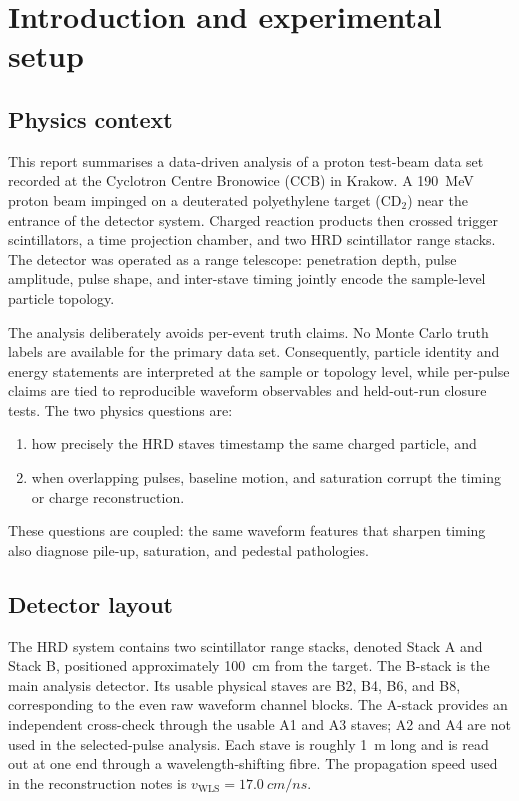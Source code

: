 \chapter{Introduction and experimental setup}

\section{Physics context}

This report summarises a data-driven analysis of a proton test-beam data set
recorded at the Cyclotron Centre Bronowice (CCB) in Krakow.  A
\SI{190}{MeV} proton beam impinged on a deuterated polyethylene target
(CD$_2$) near the entrance of the detector system.  Charged reaction products
then crossed trigger scintillators, a time projection chamber, and two HRD
scintillator range stacks.  The detector was operated as a range telescope:
penetration depth, pulse amplitude, pulse shape, and inter-stave timing jointly
encode the sample-level particle topology.

The analysis deliberately avoids per-event truth claims.  No Monte Carlo truth
labels are available for the primary data set.  Consequently, particle identity
and energy statements are interpreted at the sample or topology level, while
per-pulse claims are tied to reproducible waveform observables and held-out-run
closure tests.  The two physics questions are:
\begin{enumerate}
  \item how precisely the HRD staves timestamp the same charged particle, and
  \item when overlapping pulses, baseline motion, and saturation corrupt the
  timing or charge reconstruction.
\end{enumerate}
These questions are coupled: the same waveform features that sharpen timing
also diagnose pile-up, saturation, and pedestal pathologies.

\section{Detector layout}

The HRD system contains two scintillator range stacks, denoted Stack A and
Stack B, positioned approximately \SI{100}{cm} from the target.  The B-stack is
the main analysis detector.  Its usable physical staves are B2, B4, B6, and
B8, corresponding to the even raw waveform channel blocks.  The A-stack
provides an independent cross-check through the usable A1 and A3 staves; A2
and A4 are not used in the selected-pulse analysis.  Each stave is roughly
\SI{1}{m} long and is read out at one end through a wavelength-shifting fibre.
The propagation speed used in the reconstruction notes is
$v_{\mathrm{WLS}}=\SI{17.0}{cm/ns}$.


